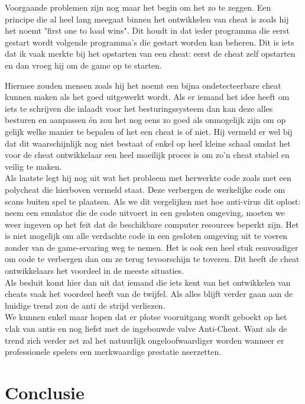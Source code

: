 \documentclass[pdftex,a4paper,12pt,twoside]{report}
\begin{document}
Voorgaande problemen zijn nog maar het begin om het zo te zeggen. Een principe die al heel lang meegaat binnen het ontwikkelen van \gls{cheat} is zoals hij het noemt "first one to load wins". Dit houdt in dat ieder programma die eerst gestart wordt volgende programma's die gestart worden kan beheren. Dit is iets dat ik vaak merkte bij het opstarten van een \gls{cheat}: eerst de \gls{cheat} zelf opstarten en dan vroeg hij om de game op te starten.

Hiermee zouden mensen zoals hij het noemt een bijna ondetecteerbare \gls{cheat} kunnen maken als het goed uitgewerkt wordt. Als er iemand het idee heeft om iets te schrijven die inlaadt voor het besturingssysteem dan kan deze alles besturen en aanpassen én zou het nog eens zo goed als onmogelijk zijn om op gelijk welke manier te bepalen of het een \gls{cheat} is of niet. Hij vermeld er wel bij dat dit waarschijnlijk nog niet bestaat of enkel op heel kleine schaal omdat het voor de \gls{cheat} ontwikkelaar een heel moeilijk proces is om zo'n \gls{cheat} stabiel en veilig te maken.
\\
Als laatste legt hij nog uit wat het probleem met herwerkte code zoals met een poly\gls{cheat} die hierboven vermeld staat. Deze verbergen de werkelijke code om scans buiten spel te plaatsen. Als we dit vergelijken met hoe anti-virus dit oplost: neem een emulator die de code uitvoert in een gesloten omgeving, moeten we weer ingeven op het feit dat de beschikbare computer resources beperkt zijn. Het is niet mogelijk om alle verdachte code in een gesloten omgeving uit te voeren zonder van de game-ervaring weg te nemen. Het is ook een heel stuk eenvoudiger om code te verbergen dan om ze terug tevoorschijn te toveren. Dit heeft de \gls{cheat} ontwikkelaars het voordeel in de meeste situaties.
\\

Als besluit komt hier dan uit dat iemand die iets kent van het ontwikkelen van \gls{cheat}s vaak het voordeel heeft van de twijfel. Als alles blijft verder gaan aan de huidige trend zou de \gls{anti} de strijd verliezen. 
\\

We kunnen enkel maar hopen dat er plotse vooruitgang wordt geboekt op het vlak van \gls{anti}s en nog liefst met de ingebouwde \gls{valve} Anti-Cheat. Want als de trend zich verder zet zal het natuurlijk ongeloofwaardiger worden wanneer er professionele spelers een merkwaardige prestatie neerzetten. 
\citep{debuglog}

\chapter{Conclusie}
\label{ch:conclusie}
\end{document}
